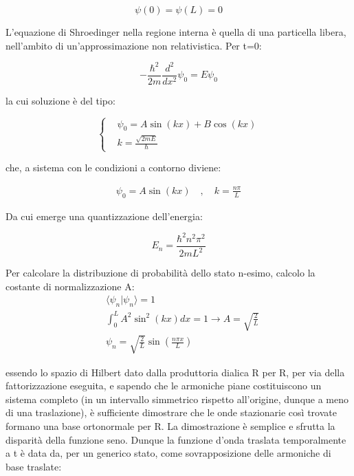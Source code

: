\documentclass{article}
\begin{document}
\begin{equation}
  \psi(0)=\psi(L)=0
\end{equation}

L'equazione di Shroedinger nella regione interna è quella di una particella libera, nell'ambito di un'approssimazione
non relativistica. Per t=0:

\begin{equation}
  -\frac{\hbar^2}{2m}\frac{d^2}{dx^2}\psi_0= E\psi_0
\end{equation}

la cui soluzione è del tipo:

\begin{equation}
  \left\{
  \begin{aligned}
     & \psi_0=A\sin(kx)+B\cos(kx) \\
     & k=\frac{\sqrt{2mE}}{\hbar}
  \end{aligned}
  \right.
\end{equation}

che, a sistema con le condizioni a contorno diviene:

\begin{equation}
  \begin{aligned}
    \psi_0= A\sin(kx) \quad , \quad k=\frac{n\pi}{L}
  \end{aligned}
\end{equation}

Da cui emerge una quantizzazione dell'energia:

\begin{equation}
  E_n=\frac{\hbar^2n^2\pi^2}{2mL^2}
\end{equation}

Per calcolare la distribuzione di probabilità dello stato n-esimo, calcolo la costante di normalizzazione A:
\begin{equation}
  \begin{aligned}
     & \langle \psi_n | \psi_n\rangle =1                                \\
     & \int_{0}^{L} A^2\sin^2(kx)dx=1  \rightarrow A=\sqrt{\frac{2}{L}} \\
     & \psi_n=\sqrt{\frac{2}{L}}\sin(\frac{n\pi x}{L})
  \end{aligned}
\end{equation}

essendo lo spazio di Hilbert dato dalla produttoria dialica R per R, per via della fattorizzazione eseguita, e sapendo che le armoniche piane costituiscono un sistema completo (in un intervallo simmetrico rispetto all'origine, dunque a meno di una traslazione),
è sufficiente dimostrare che le onde stazionarie così trovate formano una base ortonormale per R.
La dimostrazione è semplice e sfrutta la disparità della funzione seno.
Dunque la funzione d'onda traslata temporalmente a t è data da, per un generico stato, come sovrapposizione delle armoniche di base traslate:
\end{document}

